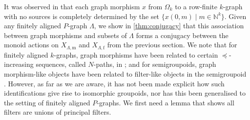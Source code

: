 \documentclass[11pt]{amsart}
\theoremstyle{definition}
\numberwithin{thm}{section}
\numberwithin{equation}{section}
\newcommand{\setof}[2]{\{ #1 \mid #2 \}}
\newcommand{\N}{\mathbb{N}}
\newcommand{\M}{\mathrm{m}}
\newcommand{\F}{\mathrm{f}}
\newcommand{\PS}[2]{X_{#2, #1}}
\begin{document}
It was observed in \cite[Remarks 2.2]{KP00} that each graph morphism $x$ from $\Omega_{k}$ to a row-finite $k$-graph with no sources is completely determined by the set $\setof{x(0, m)}{m \in \N^k}$. 
Given any finitely aligned $P$-graph $\Lambda$, we show in \cref{thm:conjugacy} that this association between graph morphisms and subsets of $\Lambda$ forms a conjugacy between the monoid actions on $\PS{\M}{\Lambda}$ and $\PS{\F}{\Lambda}$ from the previous section. 
We note that for finitely aligned $k$-graphs, graph morphisms have been related to certain $\preceq$-increasing sequences, called $N$-paths, in \cite[Page 2763]{PW05}; and for semigroupoids, graph morphism-like objects have been related to filter-like objects in the semigroupoid \cite[Proposition 19.11]{Exe08}. 
However, as far as we are aware, it has not been made explicit how such identifications give rise to isomorphic groupoids, nor has this been generalised to the setting of finitely aligned $P$-graphs. 
We first need a lemma that shows all filters are unions of principal filters. 
\end{document}
